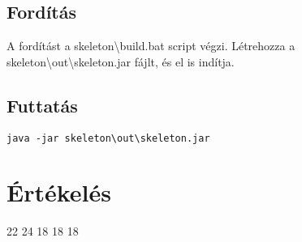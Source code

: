 \subsection{Fordítás}
A fordítást a skeleton\textbackslash{}build.bat script végzi. Létrehozza a skeleton\textbackslash{}out\textbackslash{}skeleton.jar fájlt, és el is indítja.

\subsection{Futtatás}

\lstset{escapeinside=`', xleftmargin=10pt, frame=single, basicstyle=\ttfamily\footnotesize, language=sh}
\begin{lstlisting}
java -jar skeleton\out\skeleton.jar
\end{lstlisting}

\section{Értékelés}


\begin{ertekeles}
{22}        %
{24}
{18}
{18}
{18}
\end{ertekeles}

